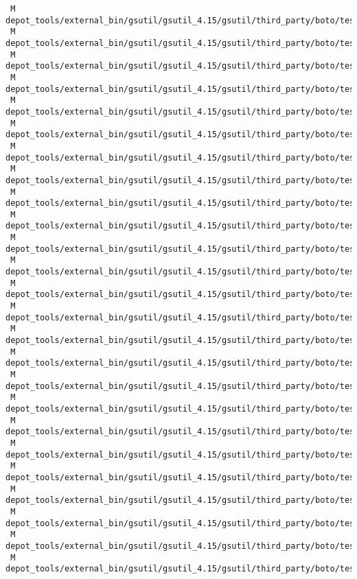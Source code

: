 \documentclass{article}
\begin{document}
\begin{verbatim}
 M depot_tools/external_bin/gsutil/gsutil_4.15/gsutil/third_party/boto/tests/integration/s3/test_connect_to_region.py
 M depot_tools/external_bin/gsutil/gsutil_4.15/gsutil/third_party/boto/tests/integration/s3/test_connection.py
 M depot_tools/external_bin/gsutil/gsutil_4.15/gsutil/third_party/boto/tests/integration/s3/test_cors.py
 M depot_tools/external_bin/gsutil/gsutil_4.15/gsutil/third_party/boto/tests/integration/s3/test_key.py
 M depot_tools/external_bin/gsutil/gsutil_4.15/gsutil/third_party/boto/tests/integration/s3/test_mfa.py
 M depot_tools/external_bin/gsutil/gsutil_4.15/gsutil/third_party/boto/tests/integration/s3/test_multidelete.py
 M depot_tools/external_bin/gsutil/gsutil_4.15/gsutil/third_party/boto/tests/integration/s3/test_multipart.py
 M depot_tools/external_bin/gsutil/gsutil_4.15/gsutil/third_party/boto/tests/integration/s3/test_pool.py
 M depot_tools/external_bin/gsutil/gsutil_4.15/gsutil/third_party/boto/tests/integration/sdb/test_connection.py
 M depot_tools/external_bin/gsutil/gsutil_4.15/gsutil/third_party/boto/tests/mturk/_init_environment.py
 M depot_tools/external_bin/gsutil/gsutil_4.15/gsutil/third_party/boto/tests/mturk/all_tests.py
 M depot_tools/external_bin/gsutil/gsutil_4.15/gsutil/third_party/boto/tests/mturk/cleanup_tests.py
 M depot_tools/external_bin/gsutil/gsutil_4.15/gsutil/third_party/boto/tests/mturk/common.py
 M depot_tools/external_bin/gsutil/gsutil_4.15/gsutil/third_party/boto/tests/mturk/create_hit_external.py
 M depot_tools/external_bin/gsutil/gsutil_4.15/gsutil/third_party/boto/tests/mturk/create_hit_test.py
 M depot_tools/external_bin/gsutil/gsutil_4.15/gsutil/third_party/boto/tests/mturk/create_hit_with_qualifications.py
 M depot_tools/external_bin/gsutil/gsutil_4.15/gsutil/third_party/boto/tests/mturk/hit_persistence.py
 M depot_tools/external_bin/gsutil/gsutil_4.15/gsutil/third_party/boto/tests/mturk/selenium_support.py
 M depot_tools/external_bin/gsutil/gsutil_4.15/gsutil/third_party/boto/tests/mturk/test_disable_hit.py
 M depot_tools/external_bin/gsutil/gsutil_4.15/gsutil/third_party/boto/tests/test.py
 M depot_tools/external_bin/gsutil/gsutil_4.15/gsutil/third_party/boto/tests/unit/auth/test_sigv4.py
 M depot_tools/external_bin/gsutil/gsutil_4.15/gsutil/third_party/boto/tests/unit/beanstalk/test_layer1.py
 M depot_tools/external_bin/gsutil/gsutil_4.15/gsutil/third_party/boto/tests/unit/cloudformation/test_connection.py
 M depot_tools/external_bin/gsutil/gsutil_4.15/gsutil/third_party/boto/tests/unit/cloudformation/test_stack.py
 M depot_tools/external_bin/gsutil/gsutil_4.15/gsutil/third_party/boto/tests/unit/cloudfront/test_signed_urls.py

\end{verbatim}
\end{document}
